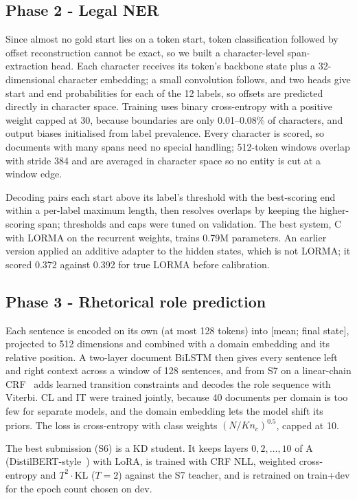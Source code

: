 \documentclass[11pt, oneside]{article}
\newcommand{\A}{\textsf{A}}\newcommand{\B}{\textsf{B}}\newcommand{\C}{\textsf{C}}\newcommand{\D}{\textsf{D}}
\begin{document}
\subsection{Phase 2 - Legal NER}
Since almost no gold start lies on a token start, token classification followed by offset reconstruction cannot be exact, so we built a character-level span-extraction head. Each character receives its token's backbone state plus a 32-dimensional character embedding; a small convolution follows, and two heads give start and end probabilities for each of the 12 labels, so offsets are predicted directly in character space. Training uses binary cross-entropy with a positive weight capped at 30, because boundaries are only 0.01--0.08\% of characters, and output biases initialised from label prevalence. Every character is scored, so documents with many spans need no special handling; 512-token windows overlap with stride 384 and are averaged in character space so no entity is cut at a window edge.

Decoding pairs each start above its label's threshold with the best-scoring end within a per-label maximum length, then resolves overlaps by keeping the higher-scoring span; thresholds and caps were tuned on validation. The best system, \C{} with LORMA on the recurrent weights, trains 0.79M parameters. An earlier version applied an additive adapter to the hidden states, which is not LORMA; it scored 0.372 against 0.392 for true LORMA before calibration.

\subsection{Phase 3 - Rhetorical role prediction}
Each sentence is encoded on its own (at most 128 tokens) into [mean; final state], projected to 512 dimensions and combined with a domain embedding and its relative position. A two-layer document BiLSTM then gives every sentence left and right context across a window of 128 sentences, and from S7 on a linear-chain CRF~\cite{lafferty2001crf} adds learned transition constraints and decodes the role sequence with Viterbi. CL and IT were trained jointly, because 40 documents per domain is too few for separate models, and the domain embedding lets the model shift its priors. The loss is cross-entropy with class weights $(N/Kn_c)^{0.5}$, capped at 10.

The best submission (S6) is a KD student. It keeps layers $0, 2, \ldots, 10$ of \A{} (DistilBERT-style~\cite{sanh2019distilbert}) with LoRA, is trained with CRF NLL, weighted cross-entropy and $T^2\cdot\mathrm{KL}$ ($T=2$) against the S7 teacher, and is retrained on train+dev for the epoch count chosen on dev.
\end{document}
